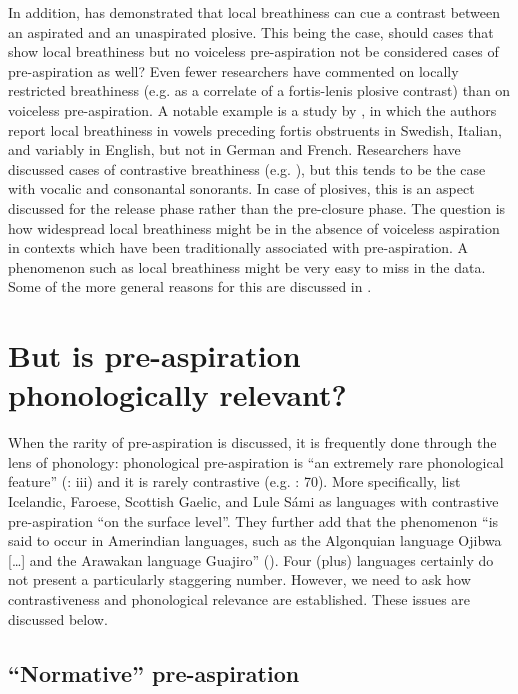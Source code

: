 \documentclass[output=paper]{langscibook}
\begin{document}
In addition, \citet[185, 373, 393]{Chasaide1985} has demonstrated that local breathiness can cue a contrast between an aspirated and an unaspirated plosive. This being the case, should cases that show local breathiness but no voiceless pre\hyp aspiration not be considered cases of pre\hyp aspiration as well? Even fewer researchers have commented on locally restricted breathiness (e.g. as a correlate of a fortis-lenis plosive contrast) than on voiceless pre-aspiration. A notable example is a study by \citet[310--315]{ChasaideGobl1993}, in which the authors report local breathiness in vowels preceding fortis obstruents in Swedish, Italian, and variably in English, but not in German and French. Researchers have discussed cases of contrastive breathiness (e.g. \cites[132]{Maddieson1984}[57--58, 317]{LadefogedMaddieson1996}), but this tends to be the case with vocalic and consonantal sonorants. In case of plosives, this is an aspect discussed for the release phase rather than the pre-closure phase. The question is how widespread local breathiness might be in the absence of voiceless aspiration in contexts which have been traditionally associated with pre-aspiration. A phenomenon such as local breathiness might be very easy to miss in the data. Some of the more general reasons for this are discussed in .

\section{But is pre-aspiration phonologically relevant?}\label{sec:hejna:3}
When the rarity of pre\hyp aspiration is discussed, it is frequently done through the lens of phonology: phonological pre\hyp aspiration is “an extremely rare phonological feature” (\citealt{Clayton2010}: iii) and it is rarely contrastive (e.g. \citealt{LadefogedMaddieson1996}: 70). More specifically, \citet[70]{LadefogedMaddieson1996} list Icelandic, Faroese, Scottish Gaelic, and Lule Sámi as languages with contrastive pre\hyp aspiration “on the surface level”. They further add that the phenomenon “is said to occur in Amerindian languages, such as the Algonquian language Ojibwa […] and the Arawakan language Guajiro” (\citeyear[72]{LadefogedMaddieson1996}). Four (plus) languages certainly do not present a particularly staggering number. However, we need to ask how contrastiveness and phonological relevance are established. These issues are discussed below.


\subsection{“Normative” pre-aspiration}\label{sec:hejna:3.1}
\end{document}
